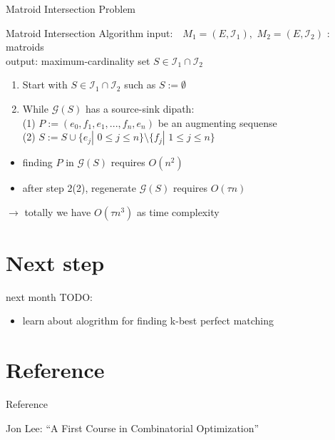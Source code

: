 \documentclass[11pt,xcolor=dvipsnames,table,dvipdfmx]{beamer}
\begin{document}
\begin{frame}{Matroid Intersection Problem}
 \begin{block}{Matroid Intersection Algorithm}
  input: \,\, $M_1 = (E, \mathcal{I}_1),\,\,M_2 = (E, \mathcal{I}_2)$ : matroids\\
  output: maximum-cardinality set $S \in \mathcal{I}_1 \cap \mathcal{I}_2$
  \begin{enumerate}
   \item Start with $S \in \mathcal{I}_1 \cap \mathcal{I}_2$ such as $S := \emptyset $
   \item While $\mathcal{G}(S)$ has a source-sink dipath:\\
	 (1) $P := (e_0, f_1, e_1, ..., f_n, e_n)$ be an augmenting sequense\\
	 (2) $S := S \cup \{e_j |\,\,0 \leq j \leq n\} \setminus \{f_j |\,\,1 \leq j \leq n\}$
  \end{enumerate}
 \end{block}
 \begin{itemize}
  \item finding $P$ in $\mathcal{G}(S)$ requires $O(n^2)$\\
  \item  after step 2(2), regenerate $\mathcal{G}(S)$ requires $O(\tau n)$\\
 \end{itemize}
 $\rightarrow$ totally we have $O(\tau n^3)$ as time complexity
\end{frame}

\section{Next step}
\begin{frame}{next month}
 TODO:
 \begin{itemize}
  \item learn about alogrithm for finding k-best perfect matching
 \end{itemize}
\end{frame}

\section{Reference}
\begin{frame}{Reference}
 \begin{thebibliography}{9}
	  \small{Jon Lee: ``A First Course in Combinatorial Optimization''}
 \end{thebibliography}
\end{frame}
\end{document}
